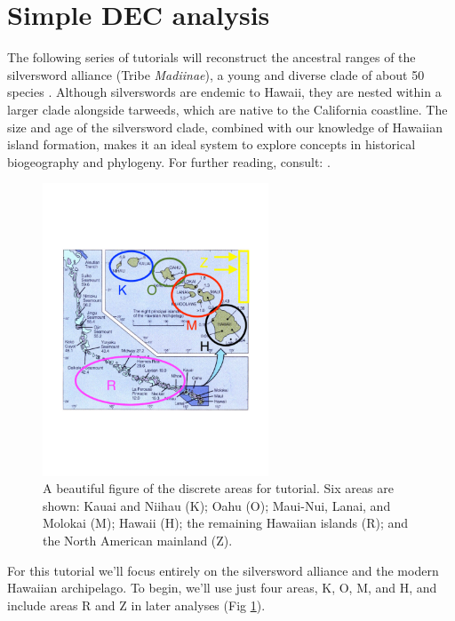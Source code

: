 

\section{Simple DEC analysis} \label{sec:bg_simple}


The following series of tutorials will reconstruct the ancestral ranges of the silversword alliance (Tribe {\it Madiinae}), a young and diverse clade of about 50 species \citep{Baldwin1991}.
Although silverswords are endemic to Hawaii, they are nested within a larger clade alongside tarweeds, which are native to the California coastline.
The size and age of the silversword clade, combined with our knowledge of Hawaiian island formation, makes it an ideal system to explore concepts in historical biogeography and phylogeny.
For further reading, consult: \citet{Carlquist1959, Baldwin1998}.
 
\begin{figure}[!ht]
\centering
\includegraphics[width=0.6\textwidth]{figures/fig_hawaii_areas.pdf}
\caption{A beautiful figure of the discrete areas for tutorial. Six areas are shown: Kauai and Niihau (K); Oahu (O); Maui-Nui, Lanai, and Molokai (M); Hawaii (H); the remaining Hawaiian islands (R); and the North American mainland (Z).}
\label{fig:hawaii_areas}
\end{figure}
 
For this tutorial we'll focus entirely on the silversword alliance and the modern Hawaiian archipelago.
To begin, we'll use just four areas, K, O, M, and H, and include areas R and Z in later analyses (Fig \ref{fig:hawaii_areas}).

